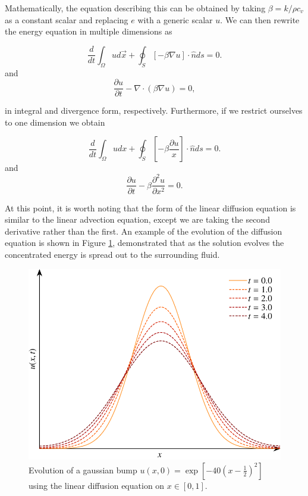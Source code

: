 Mathematically, the equation describing this can be obtained by taking $\beta = k/{\rho c_v}$ as a constant scalar and replacing $e$ with a generic scalar $u$. We can then rewrite the energy equation in multiple dimensions as
\begin{eqBox}
\begin{equation}
\frac{d}{dt}\int_\Omega u d\vec{x} + \oint_S \left[ - \beta \nabla u \right] \cdot \hat{n} ds = 0.
\end{equation}
and
\begin{equation}
\frac{\partial u}{\partial t} - \nabla \cdot (\beta \nabla u) = 0,
\end{equation}
\end{eqBox}
in integral and divergence form, respectively. Furthermore, if we restrict ourselves to one dimension we obtain
\begin{eqBox}
\begin{equation}
\frac{d}{dt}\int_\Omega u dx + \oint_S \left[ - \beta  \frac{\partial u}{x} \right] \cdot \hat{n} ds = 0.
\end{equation}
and
\begin{equation}
\frac{\partial u}{\partial t} - \beta \frac{\partial^2 u}{\partial x^2} = 0.
\end{equation}
\end{eqBox}
At this point, it is worth noting that the form of the linear diffusion equation is similar to the linear advection equation, except we are taking the second derivative rather than the first. An example of the evolution of the diffusion equation is shown in Figure \ref{fig:diffusion_equation}, demonstrated that as the solution evolves the concentrated energy is spread out to the surrounding fluid.
\begin{figure}[htbp]
	\centering
	\includegraphics[width=0.65\linewidth]{Pictures/diffusion_equation}
	\caption{Evolution of a gaussian bump $u(x,0)=\exp\left[-40\left(x-\frac{1}{2}\right)^2\right]$ using the linear diffusion equation on $x\in[0,1]$.}
	\label{fig:diffusion_equation}
\end{figure}

